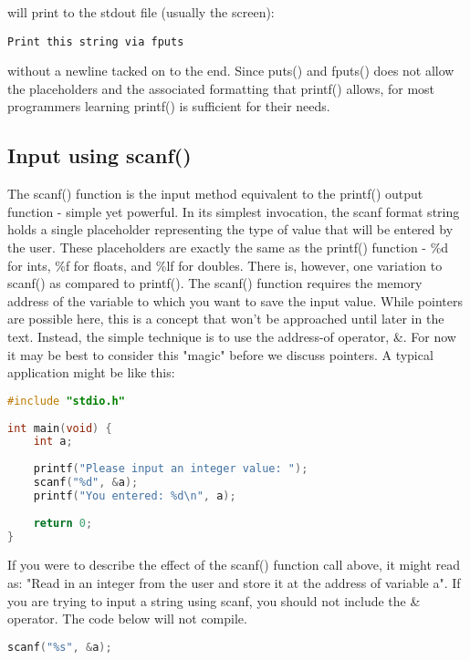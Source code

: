 will print to the stdout file (usually the screen):
\scriptsize
\begin{verbatim}
Print this string via fputs
\end{verbatim}
\normalsize

without a newline tacked on to the end.  Since puts() and fputs() does not
allow the placeholders and the associated formatting that printf() allows, for
most programmers learning printf() is sufficient for their needs.

\subsection{Input using scanf()}
The scanf() function is the input method equivalent to the printf() output
function - simple yet powerful. In its simplest invocation, the scanf format
string holds a single placeholder representing the type of value that will be
entered by the user. These placeholders are exactly the same as the printf()
function - \%d for ints, \%f for floats, and \%lf for doubles. There is, however,
one variation to scanf() as compared to printf(). The scanf() function requires
the memory address of the variable to which you want to save the input value.
While pointers are possible here, this is a concept that won't be approached
until later in the text. Instead, the simple technique is to use the address-of
operator, \&. For now it may be best to consider this "magic" before we discuss
pointers. A typical application might be like this:
\lstset{basicstyle=\scriptsize, numbers=left, captionpos=b, tabsize=4}
\begin{lstlisting}[caption=Section \thesection listing \arabic{inout},language={C},
breaklines=true,xleftmargin=15pt,label=lst:section\thesection listing\arabic{inout}]
#include "stdio.h"
 
int main(void) {
	int a;
	
	printf("Please input an integer value: ");
	scanf("%d", &a);
	printf("You entered: %d\n", a);
	
	return 0;
}
\end{lstlisting}

If you were to describe the effect of the scanf() function call above, it might
read as: "Read in an integer from the user and store it at the address of
variable a".  If you are trying to input a string using scanf, you should not
include the \& operator. The code below will not compile.
\lstset{basicstyle=\scriptsize, numbers=left, captionpos=b, tabsize=4}
\begin{lstlisting}[caption=Section \thesection listing \arabic{inout},language={C},
breaklines=true,xleftmargin=15pt,label=lst:section\thesection listing\arabic{inout}]
scanf("%s", &a);
\end{lstlisting}

